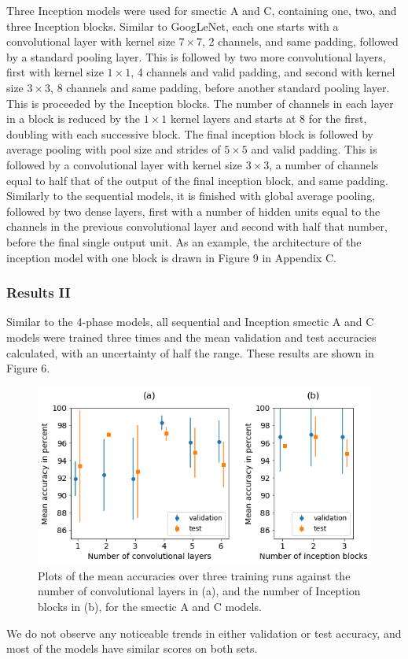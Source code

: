 \documentclass[12pt]{article}
\begin{document}
Three Inception models were used for smectic A and C, containing one, two, and three Inception blocks. Similar to GoogLeNet, each one starts with a convolutional layer with kernel size $7 \times 7$, 2 channels, and same padding, followed by a standard pooling layer. This is followed by two more convolutional layers, first with kernel size $1 \times 1$, 4 channels and valid padding, and second with kernel size $3 \times 3$, 8 channels and same padding, before another standard pooling layer. This is proceeded by the Inception blocks. The number of channels in each layer in a block is reduced by the $1 \times 1$ kernel layers and starts at 8 for the first, doubling with each successive block. The final inception block is followed by average pooling with pool size and strides of $5 \times 5$ and valid padding. This is followed by a convolutional layer with kernel size $3 \times 3$, a number of channels equal to half that of the output of the final inception block, and same padding. Similarly to the sequential models, it is finished with global average pooling, followed by two dense layers, first with a number of hidden units equal to the channels in the previous convolutional layer and second with half that number, before the final single output unit. As an example, the architecture of the inception model with one block is drawn in Figure 9 in Appendix C.
\subsubsection{Results II}
Similar to the 4-phase models, all sequential and Inception smectic A and C models were trained three times and the mean validation and test accuracies calculated, with an uncertainty of half the range. These results are shown in Figure 6. 
\begin{figure}[!ht]
	\centering
    \includegraphics[width=5.6678in]{images/smecticAC_graphs.png}
    \caption{Plots of the mean accuracies over three training runs against the number of convolutional layers in (a), and the number of Inception blocks in (b), for the smectic A and C models.}
\end{figure} 
We do not observe any noticeable trends in either validation or test accuracy, and most of the models have similar scores on both sets.
\end{document}
